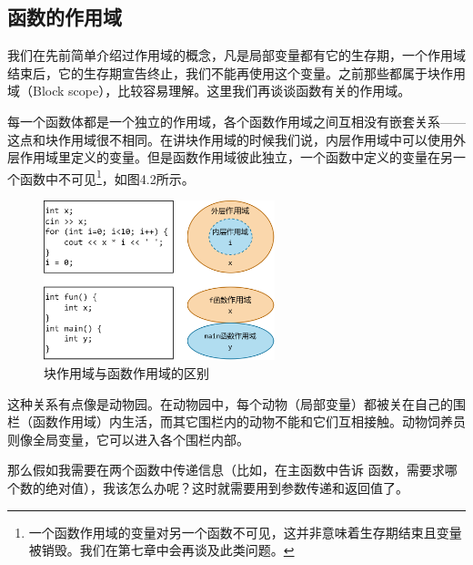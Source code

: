 \subsection*{函数的作用域}
我们在先前简单介绍过作用域的概念，凡是局部变量都有它的生存期，一个作用域结束后，它的生存期宣告终止，我们不能再使用这个变量。之前那些都属于块作用域（Block scope），比较容易理解。这里我们再谈谈函数有关的作用域。\par
每一个函数体都是一个独立的作用域，各个函数作用域之间互相没有嵌套关系——这点和块作用域很不相同。在讲块作用域的时候我们说，内层作用域中可以使用外层作用域里定义的变量。但是函数作用域彼此独立，一个函数中定义的变量在另一个函数中不可见\footnote{一个函数作用域的变量对另一个函数不可见，这并非意味着生存期结束且变量被销毁。我们在第七章中会再谈及此类问题。}，如图4.2所示。\par
\begin{figure}[htbp]
    \centering
    \includegraphics[width=0.6\textwidth]{../images/generalized_parts/04_block_scope_and_function_scope_300.png}
    \caption{块作用域与函数作用域的区别}
\end{figure}
这种关系有点像是动物园。在动物园中，每个动物（局部变量）都被关在自己的围栏（函数作用域）内生活，而其它围栏内的动物不能和它们互相接触。动物饲养员则像全局变量，它可以进入各个围栏内部。\par
那么假如我需要在两个函数中传递信息（比如，在主函数中告诉 \lstinline@f@ 函数，需要求哪个数的绝对值），我该怎么办呢？这时就需要用到参数传递和返回值了。\par
